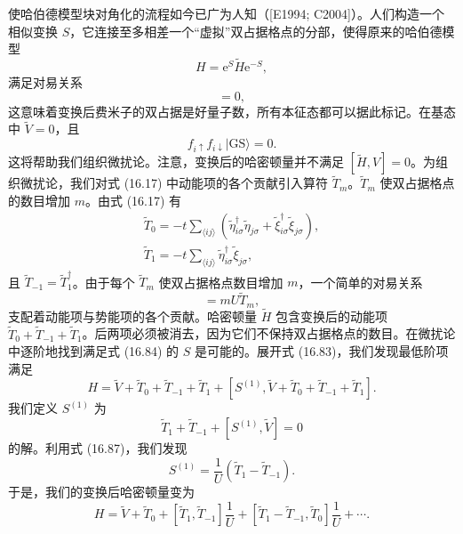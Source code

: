 使哈伯德模型块对角化的流程如今已广为人知（[E1994; C2004]）。人们构造一个相似变换 $S$，它连接至多相差一个“虚拟”双占据格点的分部，使得原来的哈伯德模型
\begin{equation*}
H=\mathrm{e}^{S}\tilde{H}\mathrm{e}^{-S},\tag{16.83}
\end{equation*}
满足对易关系
\begin{equation*}
[H,\tilde{V}]=0,\tag{16.84}
\end{equation*}
这意味着变换后费米子的双占据是好量子数，所有本征态都可以据此标记。在基态中 $\tilde{V}=0$，且
\begin{equation*}
f_{i\uparrow}f_{i\downarrow}|\mathrm{GS}\rangle=0.\tag{16.85}
\end{equation*}
这将帮助我们组织微扰论。注意，变换后的哈密顿量并不满足 $[\tilde{H},V]=0$。为组织微扰论，我们对式 (16.17) 中动能项的各个贡献引入算符 $\tilde{T}_{m}$。$\tilde{T}_{m}$ 使双占据格点的数目增加 $m$。由式 (16.17) 有
\begin{align*}
\tilde{T}_{0}=-t\sum_{\langle ij\rangle}\left(\tilde{\eta}^{\dagger}_{i\sigma}\tilde{\eta}_{j\sigma}+\tilde{\xi}^{\dagger}_{i\sigma}\tilde{\xi}_{j\sigma}\right),\\
\tilde{T}_{1}=-t\sum_{\langle ij\rangle}\tilde{\eta}^{\dagger}_{i\sigma}\tilde{\xi}_{j\sigma},\tag{16.86}
\end{align*}
且 $\tilde{T}_{-1}=\tilde{T}^{\dagger}_{1}$。由于每个 $\tilde{T}_{m}$ 使双占据格点数目增加 $m$，一个简单的对易关系
\begin{equation*}
[\tilde{V},\tilde{T}_{m}]=mU\tilde{T}_{m},\tag{16.87}
\end{equation*}
支配着动能项与势能项的各个贡献。哈密顿量 $\tilde{H}$ 包含变换后的动能项 $\tilde{T}_{0}+\tilde{T}_{-1}+\tilde{T}_{1}$。后两项必须被消去，因为它们不保持双占据格点的数目。在微扰论中逐阶地找到满足式 (16.84) 的 $S$ 是可能的。展开式 (16.83)，我们发现最低阶项满足
\begin{equation*}
H=\tilde{V}+\tilde{T}_{0}+\tilde{T}_{-1}+\tilde{T}_{1}+[S^{(1)},\tilde{V}+\tilde{T}_{0}+\tilde{T}_{-1}+\tilde{T}_{1}].\tag{16.88}
\end{equation*}
我们定义 $S^{(1)}$ 为
\begin{equation*}
\tilde{T}_{1}+\tilde{T}_{-1}+[S^{(1)},\tilde{V}]=0\tag{16.89}
\end{equation*}
的解。利用式 (16.87)，我们发现
\begin{equation*}
S^{(1)}=\frac{1}{U}\left(\tilde{T}_{1}-\tilde{T}_{-1}\right).\tag{16.90}
\end{equation*}
于是，我们的变换后哈密顿量变为
\begin{equation*}
H=\tilde{V}+\tilde{T}_{0}+[\tilde{T}_{1},\tilde{T}_{-1}]\frac{1}{U}+[\tilde{T}_{1}-\tilde{T}_{-1},\tilde{T}_{0}]\frac{1}{U}+\cdots.\tag{16.91}
\end{equation*}

